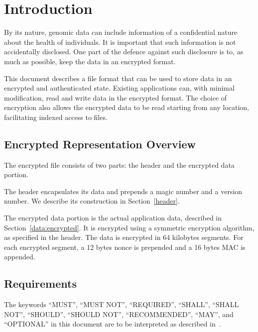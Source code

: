 \section{Introduction}

By its nature, genomic data can include information of a confidential nature about the health of individuals.
%
It is important that such information is not accidentally disclosed.
%
One part of the defence against such disclosure is to, as much as possible, keep the data in an encrypted format.
%

This document describes a file format that can be used to store data in an encrypted and authenticated state.
%
Existing applications can, with minimal modification, read and write data in the encrypted format.
%
The choice of encryption also allows the encrypted data to be read starting from any location, facilitating indexed access to files.

\subsection{Encrypted Representation Overview}

The encrypted file consists of two parts: the header and the encrypted data portion.

The header encapsulates its data and prepends a magic number and a version number.
%
We describe its construction in Section~\ref{header}.

The encrypted data portion is the actual application data, described in Section~\ref{data:encrypted}.
% 
It is encrypted using a symmetric encryption algorithm, as specified in the header.
% 
The data is encrypted in 64 kilobytes segments. For each encrypted segment, a 12 bytes nonce is prepended and a 16 bytes MAC is appended.


\subsection{Requirements}

The keywords ``MUST'', ``MUST NOT'', ``REQUIRED'', ``SHALL'', ``SHALL NOT'', ``SHOULD'', ``SHOULD NOT'', ``RECOMMENDED'', ``MAY'', and ``OPTIONAL'' in this document are to be interpreted as described in~\cite{RFC2119}.

